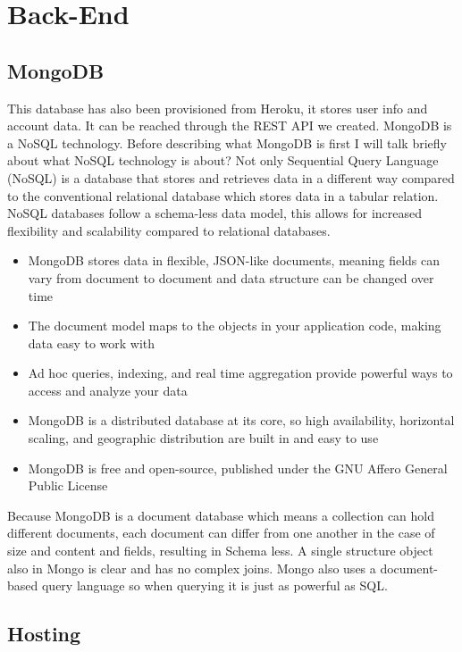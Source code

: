 \section{Back-End}
\subsection{MongoDB}
This database has also been provisioned from Heroku, it stores user info and account data. It can be reached through the REST API we created. MongoDB is a NoSQL technology. Before describing what MongoDB is first I will talk briefly about what NoSQL technology is about? Not only Sequential Query Language (NoSQL) is a database that stores and retrieves data in a different way compared to the conventional relational database which stores data in a tabular relation. NoSQL databases follow a schema-less data model, this allows for increased flexibility and scalability compared to relational databases.
\begin{itemize}
    \item MongoDB stores data in flexible, JSON-like documents, meaning fields can vary from document to document and data structure can be changed over time \cite{mongo}
    \item The document model maps to the objects in your application code, making data easy to work with \cite{mongo}
    \item Ad hoc queries, indexing, and real time aggregation provide powerful ways to access and analyze your data \cite{mongo}
    \item MongoDB is a distributed database at its core, so high availability, horizontal scaling, and geographic distribution are built in and easy to use \cite{mongo}
    \item MongoDB is free and open-source, published under the GNU Affero General Public License \cite{mongo}
\end{itemize}

 Because MongoDB is a document database which means a collection can hold different documents, each document can differ from one another in the case of size and content and fields, resulting in Schema less. A single structure object also in Mongo is clear and has no complex joins. Mongo also uses a document-based query language so when querying it is just as powerful as SQL.




\subsection{Hosting}
